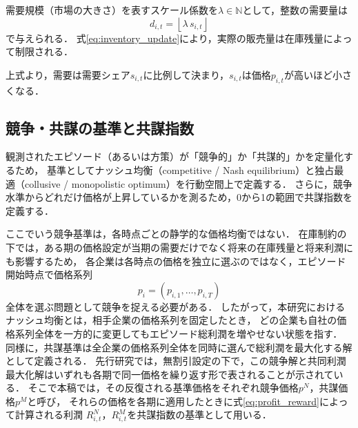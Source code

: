 \documentclass[runningheads]{llncs}
\begin{document}
需要規模（市場の大きさ）を表すスケール係数を$\lambda\in\mathbb{N}$として，整数の需要量は
\begin{equation}
d_{i,t}=\left\lfloor \lambda\, s_{i,t} \right\rfloor
\label{eq:scaled_demand_const}
\end{equation}
で与えられる．
式\eqref{eq:inventory_update}により，実際の販売量は在庫残量によって制限される．

上式より，需要は需要シェア$s_{i,t}$に比例して決まり，$s_{i,t}$は価格$p_{i,t}$が高いほど小さくなる．

\subsection{競争・共謀の基準と共謀指数}
観測されたエピソード（あるいは方策）が「競争的」か「共謀的」かを定量化するため，
基準としてナッシュ均衡（competitive / Nash equilibrium）と独占最適（collusive / monopolistic optimum）を行動空間上で定義する．
さらに，競争水準からどれだけ価格が上昇しているかを測るため，0から1の範囲で共謀指数を定義する．

ここでいう競争基準は，各時点ごとの静学的な価格均衡ではない．
在庫制約の下では，ある期の価格設定が当期の需要だけでなく将来の在庫残量と将来利潤にも影響するため，
各企業は各時点の価格を独立に選ぶのではなく，エピソード開始時点で価格系列
\begin{equation}
p_i=(p_{i,1},\dots,p_{i,T})
\label{eq:episode_price_vector}
\end{equation}
全体を選ぶ問題として競争を捉える必要がある．
したがって，本研究におけるナッシュ均衡とは，相手企業の価格系列を固定したとき，
どの企業も自社の価格系列全体を一方的に変更してもエピソード総利潤を増やせない状態を指す．
同様に，共謀基準は全企業の価格系列全体を同時に選んで総利潤を最大化する解として定義される．
先行研究\cite{friedrich2025learning}では，無割引設定の下で，この競争解と共同利潤最大化解はいずれも各期で同一価格を繰り返す形で表されることが示されている．
そこで本稿では，その反復される基準価格をそれぞれ競争価格$p^N$，共謀価格$p^M$と呼び，
それらの価格を各期に適用したときに式\eqref{eq:profit_reward}によって計算される利潤
$R^N_{i,t}$，$R^M_{i,t}$を共謀指数の基準として用いる．
\end{document}
